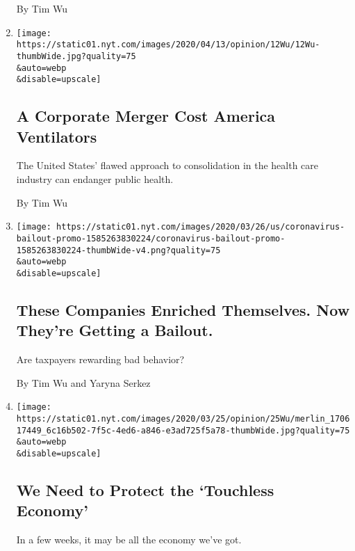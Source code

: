 \begin{enumerate}
  By Tim Wu
\item
  \href{/2020/04/12/opinion/ventilators-coronavirus.html}{}

  \texttt{[image: https://static01.nyt.com/images/2020/04/13/opinion/12Wu/12Wu-thumbWide.jpg?quality=75\\\&auto=webp\\\&disable=upscale]}

  \hypertarget{a-corporate-merger-cost-america-ventilators}{%
  \subsection{A Corporate Merger Cost America
  Ventilators}\label{a-corporate-merger-cost-america-ventilators}}

  The United States' flawed approach to consolidation in the health care
  industry can endanger public health.

  By Tim Wu
\item
  \href{/interactive/2020/03/27/opinion/coronavirus-bailout.html}{}

  \texttt{[image: https://static01.nyt.com/images/2020/03/26/us/coronavirus-bailout-promo-1585263830224/coronavirus-bailout-promo-1585263830224-thumbWide-v4.png?quality=75\\\&auto=webp\\\&disable=upscale]}

  \hypertarget{these-companies-enriched-themselves-now-theyre-getting-a-bailout}{%
  \subsection{These Companies Enriched Themselves. Now They're Getting a
  Bailout.}\label{these-companies-enriched-themselves-now-theyre-getting-a-bailout}}

  Are taxpayers rewarding bad behavior?

  By Tim Wu and Yaryna Serkez
\item
  \href{/2020/03/25/opinion/coronavirus-economy-delivery.html}{}

  \texttt{[image: https://static01.nyt.com/images/2020/03/25/opinion/25Wu/merlin\_170617449\_6c16b502-7f5c-4ed6-a846-e3ad725f5a78-thumbWide.jpg?quality=75\\\&auto=webp\\\&disable=upscale]}

  \hypertarget{we-need-to-protect-the-touchless-economy}{%
  \subsection{We Need to Protect the `Touchless
  Economy'}\label{we-need-to-protect-the-touchless-economy}}

  In a few weeks, it may be all the economy we've got.


\end{enumerate}

